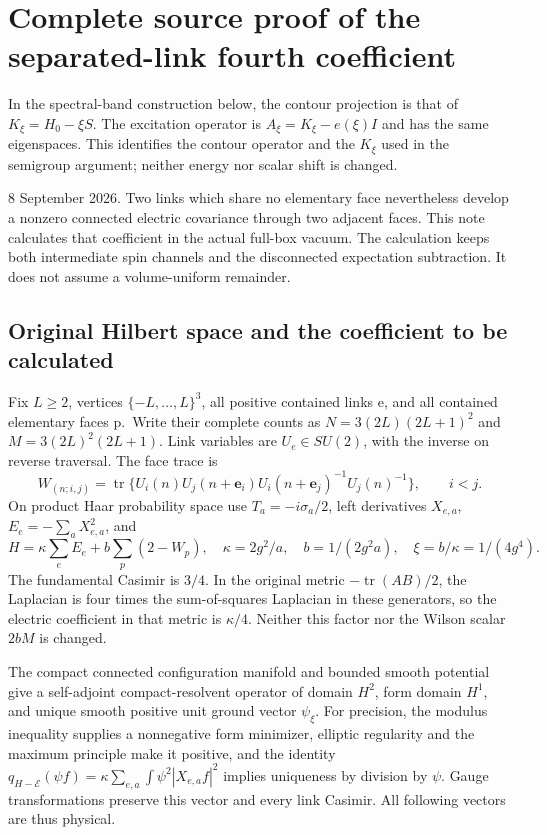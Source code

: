 \section{Complete source proof of the separated-link fourth coefficient}\label{app:xi4-source}\label{the-first-separated-link-connected-electric-covariance}

In the spectral-band construction below, the contour projection is
that of $K_\xi=H_0-\xi S$. The excitation operator is
$A_\xi=K_\xi-e(\xi)I$ and has the same eigenspaces. This identifies
the contour operator and the $K_\xi$ used in the semigroup argument;
neither energy nor scalar shift is changed.

8 September 2026. Two links which share no elementary face nevertheless develop a nonzero connected electric covariance through two adjacent faces. This note calculates that coefficient in the actual full-box vacuum. The calculation keeps both intermediate spin channels and the disconnected expectation subtraction. It does not assume a volume-uniform remainder.

\subsection{Original Hilbert space and the coefficient to be calculated}\label{original-hilbert-space-and-the-coefficient-to-be-calculated}

Fix \(L\geq2\), vertices \(\{-L,\ldots,L\}^3\), all positive contained links e, and all contained elementary faces p.~Write their complete counts as \(N=3(2L)(2L+1)^2\) and \(M=3(2L)^2(2L+1)\). Link variables are \(U_e\in SU(2)\), with the inverse on reverse traversal. The face trace is \[
 W_{(n;i,j)}=\operatorname{tr}\{U_i(n)U_j(n+\mathbf e_i)
           U_i(n+\mathbf e_j)^{-1}U_j(n)^{-1}\},\qquad i<j.
\] On product Haar probability space use \(T_a=-i\sigma_a/2\), left derivatives \(X_{e,a}\), \(E_e=-\sum_aX_{e,a}^2\), and \[
 H=\kappa\sum_eE_e+b\sum_p(2-W_p),\quad
 \kappa=2g^2/a,\quad b=1/(2g^2a),\quad\xi=b/\kappa=1/(4g^4).
\tag{S1}
\] The fundamental Casimir is \(3/4\). In the original metric \(-\operatorname{tr}(AB)/2\), the Laplacian is four times the sum-of-squares Laplacian in these generators, so the electric coefficient in that metric is \(\kappa/4\). Neither this factor nor the Wilson scalar \(2bM\) is changed.

The compact connected configuration manifold and bounded smooth potential give a self-adjoint compact-resolvent operator of domain \(H^2\), form domain \(H^1\), and unique smooth positive unit ground vector \(\psi_\xi\). For precision, the modulus inequality supplies a nonnegative form minimizer, elliptic regularity and the maximum principle make it positive, and the identity \(q_{H-\mathcal E}(\psi f)=\kappa\sum_{e,a}\int\psi^2|X_{e,a}f|^2\) implies uniqueness by division by \(\psi\). Gauge transformations preserve this vector and every link Casimir. All following vectors are thus physical.

